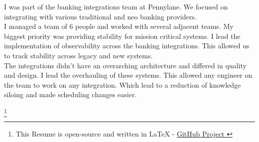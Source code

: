 \documentclass[]{matija-resume}
\begin{document}
\begin{minipage}[t]{1.0\textwidth}
\vspace{\topsep}
I was part of the banking integrations team at Pennylane. We focused on integrating with various traditional and neo banking providers.\\
\vspace{\topsep}
I managed a team of 6 people and worked with several adjacent teams. My biggest priority was providing stability for mission critical systems. I lead the implementation of observability across the banking integrations. This allowed us to track stability across legacy and new systems.\\
\vspace{\topsep}
The integrations didn't have an overarching architecture and differed in quality and design. I lead the overhauling of these systems. This allowed any engineer on the team to work on any integration. Which lead to a reduction of knowledge siloing and made scheduling changes easier.\\
\sectionsep

\end{minipage}

\footnote{This Resume is open-source and written in LaTeX - \href{https://github.com/matteeyah/resume}{GitHub Project \faExternalLink}}
\end{document}
